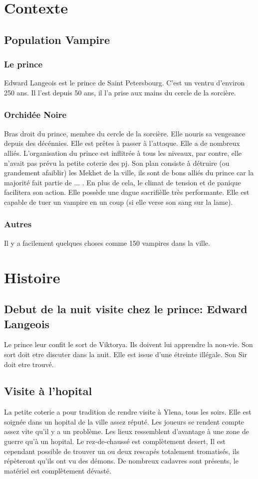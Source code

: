 \documentclass[oneside,12pt]{book}
\begin{document}
\begin{flushleft}
\chapter{Contexte}
\section{Population Vampire}
\subsection{Le prince}
Edward Langeois est le prince de Saint Petersbourg. C'est un ventru d'environ 250 ans. Il l'est depuis 50 ans, il l'a prise aux mains du cercle de la sorcière.

\subsection{Orchidée Noire}
Bras droit du prince, membre du cercle de la sorcière. Elle nouris sa vengeance depuis des décénnies. Elle est prêtes à passer à l'attaque.
Elle a de nombreux alliés. L'organisation du prince est inflitrée à tous les niveaux, par contre, elle n'avait pas prévu la petite coterie des pj.
Son plan consiste à détruire (ou grandement afaiblir) les Mekhet de la ville, ils sont de bons alliés du prince car la majorité fait partie de ... .
En plus de cela, le climat de tension et de panique facilitera son action. Elle possède une dague sacrifièlle très performante. Elle est capable de tuer un vampire en un coup (si elle verse son sang sur la lame).

\subsection{Autres}
Il y a facilement quelques choses comme 150 vampires dans la ville.

\chapter{Histoire}
\section{Debut de la nuit visite chez le prince: Edward Langeois}
Le prince leur confit le sort de Viktorya. Ils doivent lui apprendre la non-vie. Son sort doit etre discuter dans la nuit. Elle est issue d'une étreinte illégale.
Son Sir doit etre trouvé.

\section{Visite à l'hopital}
La petite coterie a pour tradition de rendre visite à Ylena, tous les soirs. Elle est soignée dans un hopital de la ville assez réputé.
Les joueurs se rendent compte assez vite qu'il y a un problème. Les lieux ressemblent d'avantage à une zone de guerre qu'à un hopital.
Le rez-de-chaussé est complètement desert, Il est cependant possible de trouver un ou deux rescapés totalement tromatisés, ils répèteront qu'ils ont vu des démons. De nombreux cadavres sont présents, le matériel est complètement dévasté.


\end{flushleft}
\end{document}
